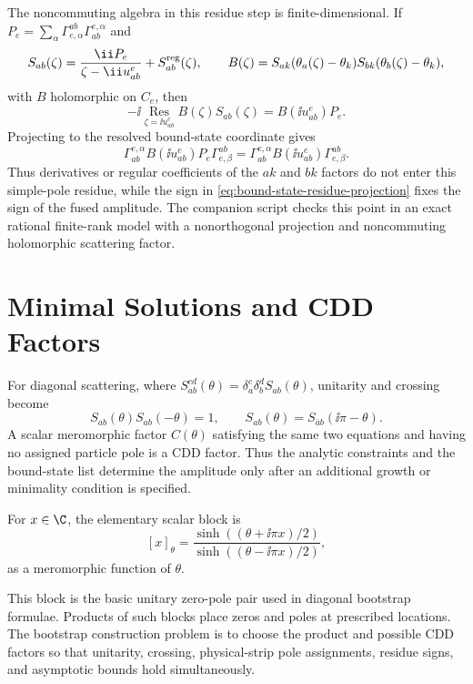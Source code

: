 The noncommuting algebra in this residue step is finite-dimensional.  If
\(P_e=\sum_\alpha\Gamma_{e,\alpha}^{ab}\Gamma_{ab}^{e,\alpha}\) and
\[
  S_{ab}(\zeta)=\frac{\ii P_e}{\zeta-\ii u_{ab}^{e}}+S_{ab}^{\rm reg}(\zeta),
  \qquad
  B(\zeta)=
  S_{ak}(\theta_a(\zeta)-\theta_k)
  S_{bk}(\theta_b(\zeta)-\theta_k),
\]
with \(B\) holomorphic on \(C_e\), then
\[
  -\ii\operatorname*{Res}_{\zeta=\ii u_{ab}^{e}}B(\zeta)S_{ab}(\zeta)
  =
  B(\ii u_{ab}^{e})P_e .
\]
Projecting to the resolved bound-state coordinate gives
\[
  \Gamma_{ab}^{e,\alpha}B(\ii u_{ab}^{e})P_e\Gamma_{e,\beta}^{ab}
  =
  \Gamma_{ab}^{e,\alpha}B(\ii u_{ab}^{e})\Gamma_{e,\beta}^{ab}.
\]
Thus derivatives or regular coefficients of the \(ak\) and \(bk\) factors do
not enter this simple-pole residue, while the sign in
\eqref{eq:bound-state-residue-projection} fixes the sign of the fused
amplitude.  The companion script
 checks
this point in an exact rational finite-rank model with a nonorthogonal
projection and noncommuting holomorphic scattering factor.

\section{Minimal Solutions and CDD Factors}

For diagonal scattering, where \(S_{ab}^{cd}(\theta)=
\delta_a^c\delta_b^d S_{ab}(\theta)\), unitarity and crossing become
\[
  S_{ab}(\theta)S_{ab}(-\theta)=1,
  \qquad
  S_{ab}(\theta)=S_{\bar a b}(\ii\pi-\theta).
\]
A scalar meromorphic factor \(C(\theta)\) satisfying the same two equations
and having no assigned particle pole is a CDD factor.  Thus the analytic
constraints and the bound-state list determine the amplitude only after an
additional growth or minimality condition is specified.

\begin{definition}
\label{def:integrable-elementary-scalar-block}
For \(x\in\C\), the elementary scalar block is
\[
  [x]_\theta
  =
  \frac{\sinh\!\left((\theta+\ii\pi x)/2\right)}
       {\sinh\!\left((\theta-\ii\pi x)/2\right)} ,
\]
as a meromorphic function of \(\theta\).
\end{definition}

This block is the basic unitary zero-pole pair used in diagonal bootstrap
formulae.  Products of such blocks place zeros and poles at prescribed
locations.  The bootstrap construction problem is to choose the product and
possible CDD factors so that unitarity, crossing, physical-strip pole
assignments, residue signs, and asymptotic bounds hold simultaneously.

